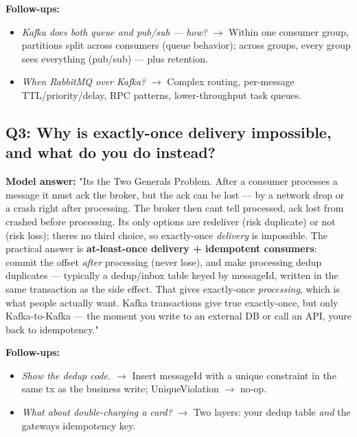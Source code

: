 \documentclass[11pt]{article}
\providecommand{\tightlist}{\setlength{\itemsep}{1pt}\setlength{\parskip}{0pt}}
\begin{document}
\textbf{Follow-ups:}

\begin{itemize}
\tightlist
\item
  \emph{Kafka does both queue and pub/sub --- how?} \(\rightarrow\) Within one consumer group, partitions split across consumers (queue behavior); across groups, every group sees everything (pub/sub) --- plus retention.
\item
  \emph{When RabbitMQ over Kafka?} \(\rightarrow\) Complex routing, per-message TTL/priority/delay, RPC patterns, lower-throughput task queues.
\end{itemize}

\subsection{Q3: Why is exactly-once delivery impossible, and what do you do instead?}\label{q3-why-is-exactly-once-delivery-impossible-and-what-do-you-do-instead}

\textbf{Model answer:} "It\textquotesingle s the Two Generals Problem. After a consumer processes a message it must ack the broker, but the ack can be lost --- by a network drop or a crash right after processing. The broker then can\textquotesingle t tell \textquotesingle processed, ack lost\textquotesingle{} from \textquotesingle crashed before processing.\textquotesingle{} Its only options are redeliver (risk duplicate) or not (risk loss); there\textquotesingle s no third choice, so exactly-once \emph{delivery} is impossible. The practical answer is \textbf{at-least-once delivery + idempotent consumers}: commit the offset \emph{after} processing (never lose), and make processing dedup duplicates --- typically a dedup/inbox table keyed by messageId, written in the same transaction as the side effect. That gives exactly-once \emph{processing}, which is what people actually want. Kafka transactions give true exactly-once, but only Kafka-to-Kafka --- the moment you write to an external DB or call an API, you\textquotesingle re back to idempotency."

\textbf{Follow-ups:}

\begin{itemize}
\tightlist
\item
  \emph{Show the dedup code.} \(\rightarrow\) Insert messageId with a unique constraint in the same tx as the business write; UniqueViolation \(\rightarrow\) no-op.
\item
  \emph{What about double-charging a card?} \(\rightarrow\) Two layers: your dedup table \emph{and} the gateway\textquotesingle s idempotency key.
\end{itemize}
\end{document}
